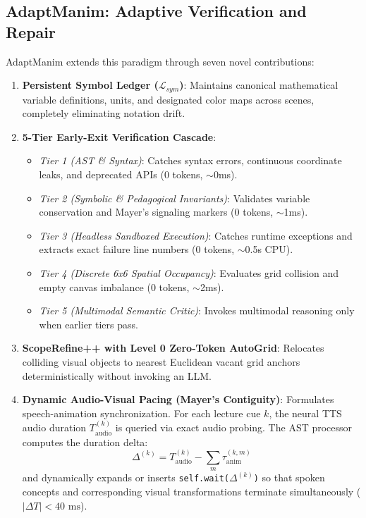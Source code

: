 \documentclass{article}
\begin{document}
\subsection{AdaptManim: Adaptive Verification and Repair}
AdaptManim extends this paradigm through seven novel contributions:
\begin{enumerate}
    \item \textbf{Persistent Symbol Ledger ($\mathcal{L}_{sym}$)}: Maintains canonical mathematical variable definitions, units, and designated color maps across scenes, completely eliminating notation drift.
    \item \textbf{5-Tier Early-Exit Verification Cascade}:
    \begin{itemize}
        \item \textit{Tier 1 (AST \& Syntax)}: Catches syntax errors, continuous coordinate leaks, and deprecated APIs (0 tokens, $\sim$0ms).
        \item \textit{Tier 2 (Symbolic \& Pedagogical Invariants)}: Validates variable conservation and Mayer's signaling markers (0 tokens, $\sim$1ms).
        \item \textit{Tier 3 (Headless Sandboxed Execution)}: Catches runtime exceptions and extracts exact failure line numbers (0 tokens, $\sim$0.5s CPU).
        \item \textit{Tier 4 (Discrete 6x6 Spatial Occupancy)}: Evaluates grid collision and empty canvas imbalance (0 tokens, $\sim$2ms).
        \item \textit{Tier 5 (Multimodal Semantic Critic)}: Invokes multimodal reasoning only when earlier tiers pass.
    \end{itemize}
    \item \textbf{ScopeRefine++ with Level 0 Zero-Token AutoGrid}: Relocates colliding visual objects to nearest Euclidean vacant grid anchors deterministically without invoking an LLM.
    \item \textbf{Dynamic Audio-Visual Pacing (Mayer's Contiguity)}: Formulates speech-animation synchronization. For each lecture cue $k$, the neural TTS audio duration $T_{\text{audio}}^{(k)}$ is queried via exact audio probing. The AST processor computes the duration delta:
    \begin{equation}
        \Delta^{(k)} = T_{\text{audio}}^{(k)} - \sum_{m} \tau_{\text{anim}}^{(k, m)}
    \end{equation}
    and dynamically expands or inserts \texttt{self.wait($\Delta^{(k)}$)} so that spoken concepts and corresponding visual transformations terminate simultaneously ($|\Delta T| < 40\text{ ms}$).

\end{enumerate}
\end{document}
